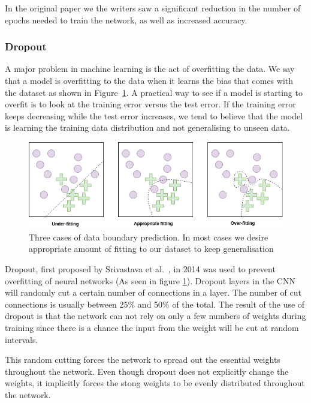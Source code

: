 In the original paper we the writers saw a significant reduction in the number of epochs needed to train the network, as well as increased accuracy.


\subsubsection{Dropout}
A major problem in machine learning is the act of overfitting the data. We say that a model is overfitting to the data when it learns the bias that comes with the dataset as shown in Figure~\ref{fig:dropout}. A practical way to see if a model is starting to overfit is to look at the training error versus the test error. If the training error keeps decreasing while the test error increases, we tend to believe that the model is learning the training data distribution and not generalising to unseen data.


\begin{figure}[t]
        \centering
        \includegraphics[scale=0.6]{background/figures/Under_vs_overfitting.png}
        \caption{Three cases of data boundary prediction. In most cases we desire appropriate amount of fitting to our dataset to keep generalisation}
        \label{fig:dropout}
\end{figure}


Dropout, first proposed by Srivastava et al.~\cite{JMLR:v15:srivastava14a}, in 2014 was used to prevent overfitting of neural networks (As seen in figure \ref{fig:dropout}).
Dropout layers in the CNN will randomly cut a certain number of connections in a layer. The number of cut connections is usually between 25\% and 50\% of the total. The result of the use of dropout is that the network can not rely on only a few numbers of weights during training since there is a chance the input from the weight will be cut at random intervals. 

This random cutting forces the network to spread out the essential weights throughout the network. 
Even though dropout does not explicitly change the weights, it implicitly forces the stong weights to be evenly distributed throughout the network. 

